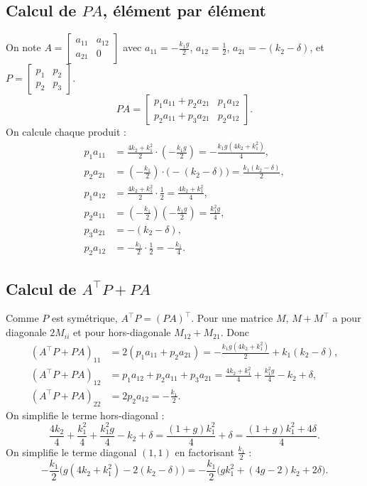 \documentclass[11pt,a4paper]{article}
\numberwithin{equation}{section}
\theoremstyle{plain}
\theoremstyle{definition}
\theoremstyle{remark}
\begin{document}
\subsection{Calcul de $PA$, élément par élément}
On note
$A=\begin{bmatrix}a_{11}&a_{12}\\a_{21}&0\end{bmatrix}$ avec
$a_{11}=-\frac{k_1g}{2}$, $a_{12}=\frac12$, $a_{21}=-(k_2-\delta)$, et $P=\begin{bmatrix}p_1&p_2\\p_2&p_3\end{bmatrix}$.
\begin{equation}
PA = \begin{bmatrix} p_1a_{11}+p_2a_{21} & p_1a_{12}\\ p_2a_{11}+p_3a_{21} & p_2a_{12}\end{bmatrix}.
\end{equation}
On calcule chaque produit :
\begin{align}
p_1a_{11} &= \frac{4k_2+k_1^2}{2}\cdot\left(-\frac{k_1g}{2}\right) = -\frac{k_1g(4k_2+k_1^2)}{4},\\
p_2a_{21} &= \left(-\frac{k_1}{2}\right)\cdot\big(-(k_2-\delta)\big) = \frac{k_1(k_2-\delta)}{2},\\
p_1a_{12} &= \frac{4k_2+k_1^2}{2}\cdot\frac12 = \frac{4k_2+k_1^2}{4},\\
p_2a_{11} &= \left(-\frac{k_1}{2}\right)\left(-\frac{k_1g}{2}\right) = \frac{k_1^2g}{4},\\
p_3a_{21} &= -(k_2-\delta),\\
p_2a_{12} &= -\frac{k_1}{2}\cdot\frac12 = -\frac{k_1}{4}.
\end{align}

\subsection{Calcul de $A^\top P+PA$}
Comme $P$ est symétrique, $A^\top P=(PA)^\top$. Pour une matrice $M$, $M+M^\top$ a pour diagonale
$2M_{ii}$ et pour hors-diagonale $M_{12}+M_{21}$. Donc
\begin{align}
(A^\top P+PA)_{11} &= 2(p_1a_{11}+p_2a_{21}) = -\frac{k_1g(4k_2+k_1^2)}{2} + k_1(k_2-\delta),\\
(A^\top P+PA)_{12} &= p_1a_{12} + p_2a_{11}+p_3a_{21} = \frac{4k_2+k_1^2}{4}+\frac{k_1^2g}{4}-k_2+\delta,\\
(A^\top P+PA)_{22} &= 2p_2a_{12} = -\frac{k_1}{2}.
\end{align}
On simplifie le terme hors-diagonal :
\begin{equation}
\frac{4k_2}{4}+\frac{k_1^2}{4}+\frac{k_1^2g}{4}-k_2+\delta = \frac{(1+g)k_1^2}{4}+\delta = \frac{(1+g)k_1^2+4\delta}{4}.
\end{equation}
On simplifie le terme diagonal $(1,1)$ en factorisant $\frac{k_1}{2}$ :
\begin{equation}
-\frac{k_1}{2}\Big(g(4k_2+k_1^2) - 2(k_2-\delta)\Big) = -\frac{k_1}{2}\Big(gk_1^2+(4g-2)k_2+2\delta\Big).
\end{equation}
\end{document}
